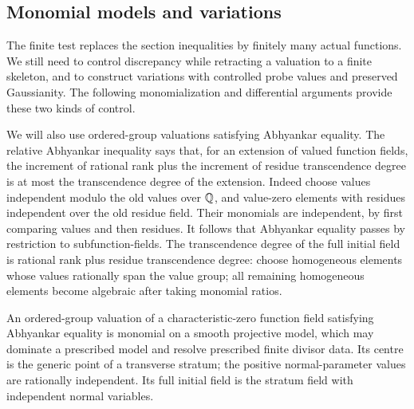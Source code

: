 \subsection{Monomial models and variations}

The finite test replaces the section inequalities by finitely many
actual functions.  We still need to control discrepancy while
retracting a valuation to a finite skeleton, and to construct variations
with controlled probe values and preserved Gaussianity.  The
following monomialization and differential arguments provide these
two kinds of control.

We will also use ordered-group valuations satisfying Abhyankar
equality.  The relative Abhyankar inequality says that, for an
extension of valued function fields, the increment of rational rank
plus the increment of residue transcendence degree is at most the
transcendence degree of the extension.  Indeed choose values
independent modulo the old values over \(\mathbb Q\), and value-zero
elements with residues independent over the old residue field.
Their monomials are independent, by first comparing values and then
residues.  It follows that Abhyankar equality passes by restriction
to subfunction-fields.  The transcendence degree of the full initial
field is rational rank plus residue transcendence degree: choose
homogeneous elements whose values rationally span the value group;
all remaining homogeneous elements become algebraic after taking
monomial ratios.

\begin{lemma}\label{c:ordered-monomialization}
An ordered-group valuation of a characteristic-zero function field
satisfying Abhyankar equality is monomial on a smooth projective
model, which may dominate a prescribed model and resolve prescribed
finite divisor data.  Its centre is the generic point of a transverse
stratum; the positive normal-parameter values are rationally independent.
Its full initial field is the stratum field with independent normal
variables.
\end{lemma}

